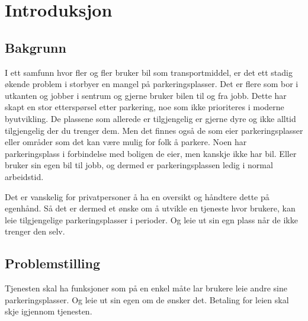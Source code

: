 \section{Introduksjon}

\subsection{Bakgrunn}
I ett samfunn hvor fler og fler bruker bil som transportmiddel, er det ett stadig økende problem i storbyer en mangel på parkeringsplasser. Det er flere som bor i utkanten og jobber i sentrum og gjerne bruker bilen til og fra jobb. Dette har skapt en stor etterspørsel etter parkering, noe som ikke prioriteres i moderne byutvikling. De plassene som allerede er tilgjengelig er gjerne dyre og ikke alltid tilgjengelig der du trenger dem. Men det finnes også de som eier parkeringsplasser eller områder som det kan være mulig for folk å parkere. Noen har parkeringsplass i forbindelse med boligen de eier, men kanskje ikke har bil. Eller bruker sin egen bil til jobb, og dermed er parkeringsplassen ledig i normal arbeidstid.

Det er vanskelig for privatpersoner å ha en oversikt og håndtere dette på egenhånd. Så det er dermed et ønske om å utvikle en tjeneste hvor brukere, kan leie tilgjengelige parkeringsplasser i perioder. Og leie ut sin egn plass når de ikke trenger den selv.




\subsection{Problemstilling}
Tjenesten skal ha funksjoner som på en enkel måte lar brukere leie andre sine parkeringsplasser. Og leie ut sin egen om de ønsker det. Betaling for leien skal skje igjennom tjenesten.

